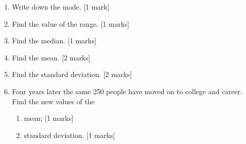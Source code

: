 \documentclass[12pt, twoside]{article}
\begin{document}
\begin{enumerate}
  \begin{enumerate}
    \item Write down the mode. \hfill [1 mark] \vspace{1.5cm}
    \item Find the value of the range. \hfill [1 marks] \vspace{1.5cm}
    \item Find the median. \hfill [1 marks] \vspace{1.5cm}
    \item Find the mean. \hfill [2 marks] \vspace{1.5cm}
    \item Find the standard deviation. \hfill [2 marks] \vspace{1.5cm}
    \item Four years later the same 250 people have moved on to college and career. Find the new values of the 
    \begin{enumerate}
      \item mean; \hfill [1 marks] \vspace{1.5cm}
      \item standard deviation. \hfill [1 marks]
    \end{enumerate}
  \end{enumerate}

\end{enumerate}
\end{document}
